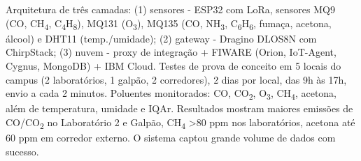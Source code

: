 \documentclass[12pt,a4paper]{article}
\begin{document}
  {Arquitetura de três camadas: (1) sensores - ESP32 com LoRa, sensores MQ9 
    (CO, CH\textsubscript{4}, C\textsubscript{4}H\textsubscript{8}), 
    MQ131 (O\textsubscript{3}), MQ135 (CO, NH\textsubscript{3}, C\textsubscript{6}H\textsubscript{6}, fumaça, acetona, álcool) 
    e DHT11 (temp./umidade); (2) gateway - Dragino DLOS8N com ChirpStack; (3) 
    nuvem - proxy de integração + FIWARE (Orion, IoT-Agent, Cygnus, MongoDB) + 
    IBM Cloud. Testes de prova de conceito em 5 locais do campus (2 laboratórios, 1 galpão, 2 corredores), 
    2 dias por local, das 9h às 17h, envio a cada 2 minutos. Poluentes monitorados: CO, CO\textsubscript{2}, O\textsubscript{3}, 
    CH\textsubscript{4}, acetona, além de temperatura, umidade e IQAr. 
    Resultados mostram maiores emissões de CO/CO\textsubscript{2} no Laboratório 2 e Galpão, 
    CH\textsubscript{4} >80 ppm nos laboratórios, acetona até 
    60 ppm em corredor externo. O sistema captou grande volume de dados com sucesso.}
\end{document}
